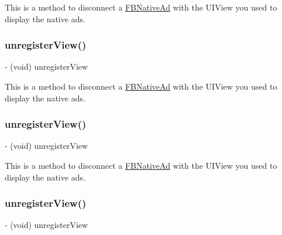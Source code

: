 This is a method to disconnect a \hyperlink{interfaceFBNativeAd}{F\+B\+Native\+Ad} with the U\+I\+View you used to display the native ads. \mbox{\label{interfaceFBNativeAd_af146b825ecd435d8e4de489f6b61dcc2}} 
\subsubsection{\texorpdfstring{unregister\+View()}{unregisterView()}\hspace{0.1cm}{\footnotesize\ttfamily [2/5]}}
{\footnotesize\ttfamily -\/ (void) unregister\+View \begin{DoxyParamCaption}{ }\end{DoxyParamCaption}}

This is a method to disconnect a \hyperlink{interfaceFBNativeAd}{F\+B\+Native\+Ad} with the U\+I\+View you used to display the native ads. \mbox{\label{interfaceFBNativeAd_af146b825ecd435d8e4de489f6b61dcc2}} 
\subsubsection{\texorpdfstring{unregister\+View()}{unregisterView()}\hspace{0.1cm}{\footnotesize\ttfamily [3/5]}}
{\footnotesize\ttfamily -\/ (void) unregister\+View \begin{DoxyParamCaption}{ }\end{DoxyParamCaption}}

This is a method to disconnect a \hyperlink{interfaceFBNativeAd}{F\+B\+Native\+Ad} with the U\+I\+View you used to display the native ads. \mbox{\label{interfaceFBNativeAd_af146b825ecd435d8e4de489f6b61dcc2}} 
\subsubsection{\texorpdfstring{unregister\+View()}{unregisterView()}\hspace{0.1cm}{\footnotesize\ttfamily [4/5]}}
{\footnotesize\ttfamily -\/ (void) unregister\+View \begin{DoxyParamCaption}{ }\end{DoxyParamCaption}}

